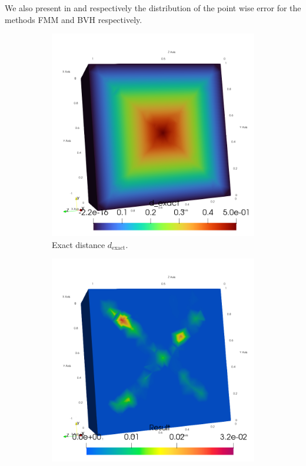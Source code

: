 We also present in  and  respectively the distribution of the point wise error for the methods FMM and BVH respectively.

\begin{figure}
    \begin{subfigure}{0.33\textwidth}
        \centering
        \includegraphics[width=\columnwidth]{graphics/feelpp/feelpp-benchmark-distance-exact}
        \caption{Exact distance $d_\mathrm{exact}$.}
        \label{fig:specs:app-feelpp-distance:results:distance}
    \end{subfigure}
    \begin{subfigure}{0.33\textwidth}
        \centering
        \includegraphics[width=\columnwidth]{graphics/feelpp/feelpp-benchmark-distance-errorFMM}

\end{subfigure}
\end{figure}
